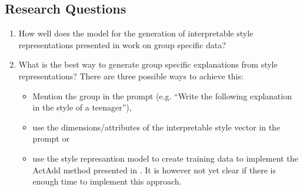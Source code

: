 \subsection{Research Questions}
\begin{enumerate}
  \item How well does the model for the generation of interpretable style representations presented in \citet{patelLearningInterpretableStyle2023} work on group specific data?
  \item What is the best way to generate group specific explanations from style representations? \newline
  There are three possible ways to achieve this:
  \begin{itemize}
    \item Mention the group in the prompt (e.g. \enquote{Write the following explanation in the style of a teenager}),
    \item use the dimensions/attributes of the interpretable style vector in the prompt or
    \item use the style represantion model to create training data to implement the ActAdd method presented in \citet{turnerActivationAdditionSteering2024}. It is however not yet clear if there is enough time to implement this approach.
  \end{itemize}
\end{enumerate}
